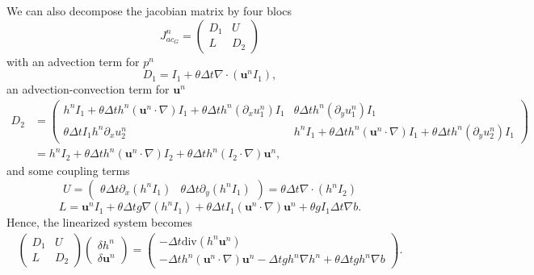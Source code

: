 \documentclass[a4paper, 11pt]{report}
\begin{document}
We can also decompose the jacobian matrix by four blocs
\begin{equation*}
J_{ac_G}^n=\begin{pmatrix}D_1&U\\L&D_2\end{pmatrix}
\end{equation*}
with an advection term for $p^n$
\begin{equation*}
D_1=I_1+\theta\Delta t\nabla \cdot(\boldsymbol{u}^nI_1),
\end{equation*}
an advection-convection term for $\boldsymbol{u}^n$
\begin{equation*}
\begin{split}
D_2&=\begin{pmatrix}h^nI_1+\theta\Delta th^n\left(\boldsymbol{u}^n\cdot \nabla\right)I_1+\theta\Delta th^n(\partial_xu_1^n)I_1&\theta\Delta th^n(\partial_yu_1^n)I_1\\
\theta\Delta tI_1h^n\partial_xu_2^n&h^nI_1+\theta\Delta th^n\left(\boldsymbol{u}^n\cdot\nabla\right)I_1+\theta\Delta th^n(\partial_yu_2^n)I_1
\end{pmatrix}\\
&=h^nI_2+\theta\Delta th^n(\boldsymbol{u}^n\cdot \nabla)I_2+\theta\Delta th^n(I_2\cdot \nabla)\boldsymbol{u}^n,
\end{split}
\end{equation*}
and some coupling terms
\begin{equation*}
U=\begin{pmatrix}\theta\Delta t\partial_x\left(h^nI_1\right)&\theta\Delta t\partial_y\left(h^nI_1\right)\end{pmatrix}=\theta\Delta t\nabla\cdot\left(h^nI_2\right)
\end{equation*}
\begin{equation*}
L=\boldsymbol{u}^nI_1+\theta\Delta tg\nabla (h^nI_1)+\theta\Delta tI_1(\boldsymbol{u}^n\cdot \nabla)\boldsymbol{u}^n+\theta gI_1\Delta t\nabla b.
\end{equation*}
Hence, the linearized system becomes
\begin{equation*}
\begin{split}
\begin{pmatrix}D_1&U\\L&D_2\end{pmatrix}\begin{pmatrix}
\delta h^n\\\delta \boldsymbol{u}^n\end{pmatrix}
=\begin{pmatrix}-\Delta t\text{div}(h^n\boldsymbol{u}^n)\\-\Delta th^n\left(\boldsymbol{u}^n\cdot\nabla\right)\boldsymbol{u}^n-\Delta tgh^n\nabla h^n+\theta\Delta tgh^n\nabla b\end{pmatrix}.
\end{split}
\end{equation*}
\end{document}

